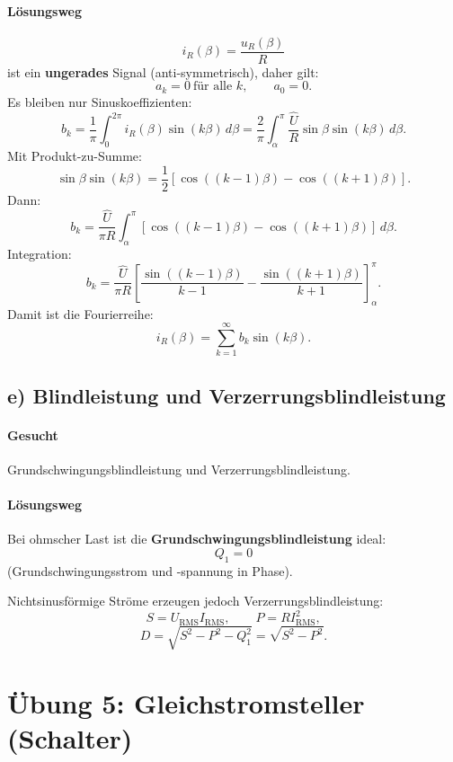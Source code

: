 \paragraph{Lösungsweg}
\[
i_R(\beta)=\frac{u_R(\beta)}{R}
\]
ist ein \textbf{ungerades} Signal (anti-symmetrisch), daher gilt:
\[
\boxed{a_k=0\ \text{für alle }k,\qquad a_0=0.}
\]
Es bleiben nur Sinuskoeffizienten:
\[
b_k=\frac{1}{\pi}\int_0^{2\pi} i_R(\beta)\sin(k\beta)\,d\beta
=
\frac{2}{\pi}\int_{\alpha}^{\pi} \frac{\hat U}{R}\sin\beta\sin(k\beta)\,d\beta.
\]
Mit Produkt-zu-Summe:
\[
\sin\beta\sin(k\beta)=\frac{1}{2}\left[\cos((k-1)\beta)-\cos((k+1)\beta)\right].
\]
Dann:
\[
b_k=\frac{\hat U}{\pi R}\int_{\alpha}^{\pi}\left[\cos((k-1)\beta)-\cos((k+1)\beta)\right]\,d\beta.
\]
Integration:
\[
\boxed{
b_k
=
\frac{\hat U}{\pi R}
\left[
\frac{\sin((k-1)\beta)}{k-1}
-
\frac{\sin((k+1)\beta)}{k+1}
\right]_{\alpha}^{\pi}
}.
\]
Damit ist die Fourierreihe:
\[
\boxed{
i_R(\beta)=\sum_{k=1}^{\infty} b_k \sin(k\beta).
}
\]


\subsection*{e) Blindleistung und Verzerrungsblindleistung}

\paragraph{Gesucht}
Grundschwingungsblindleistung und Verzerrungsblindleistung.

\paragraph{Lösungsweg}
Bei ohmscher Last ist die \textbf{Grundschwingungsblindleistung} ideal:
\[
\boxed{Q_1=0}
\]
(Grundschwingungsstrom und -spannung in Phase).

Nichtsinusförmige Ströme erzeugen jedoch Verzerrungsblindleistung:
\[
S = U_{\mathrm{RMS}} I_{\mathrm{RMS}},\qquad P=R I_{\mathrm{RMS}}^2,
\]
\[
\boxed{D=\sqrt{S^2-P^2-Q_1^2}=\sqrt{S^2-P^2}}.
\]



\section{Übung 5: Gleichstromsteller (Schalter) }

